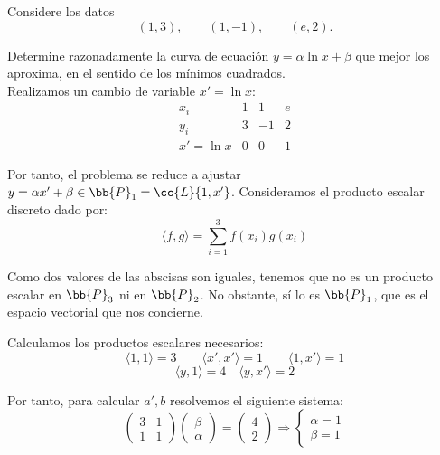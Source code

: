 \begin{ejercicio}
    Considere los datos
    \begin{equation*}
        (1,3), \qquad (1,-1), \qquad (e,2).
    \end{equation*}

    Determine razonadamente la curva de ecuación $y=\alpha\ln x + \beta$ que mejor los aproxima, en el sentido de los mínimos cuadrados.\\

    Realizamos un cambio de variable $x'=\ln x$:
    \begin{equation*}
        \begin{array}{c|c|c|c}
            x_i & 1 & 1 & e \\ \hline
            y_i & 3 & -1 & 2 \\ \hline
            x'=\ln x & 0 & 0 & 1
        \end{array}
    \end{equation*}

    Por tanto, el problema se reduce a ajustar $y=\alpha x' + \beta \in \bb{P}_1 = \cc{L}\{1,x'\}$.
    Consideramos el producto escalar discreto dado por:
    \begin{equation*}
        \langle f,g\rangle = \sum_{i=1}^3 f(x_i)g(x_i)
    \end{equation*}

    Como dos valores de las abscisas son iguales, tenemos que no es un producto escalar en $\bb{P}_3$ ni en $\bb{P}_2$. No obstante, sí lo es $\bb{P}_1$, que es el espacio vectorial que nos concierne.

    Calculamos los productos escalares necesarios:
    \begin{equation*}
        \langle 1,1\rangle = 3
        \qquad
        \langle x',x'\rangle = 1
        \qquad
        \langle 1,x'\rangle = 1
    \end{equation*}
    \begin{equation*}
        \langle y, 1\rangle = 4
        \quad
        \langle y,x'\rangle = 2
    \end{equation*}

    Por tanto, para calcular $a',b$ resolvemos el siguiente sistema:
    \begin{equation*}
        \left(\begin{array}{cc}
            3 & 1 \\
            1 & 1
        \end{array}\right)
        \left(\begin{array}{c}
            \beta \\ \alpha    
        \end{array}\right)
        = 
        \left(\begin{array}{c}
            4 \\ 2    
        \end{array}\right)
        \Longrightarrow
        \left\{\begin{array}{c}
            \alpha = 1 \\
            \beta = 1
        \end{array}\right.
    \end{equation*}


\end{ejercicio}
